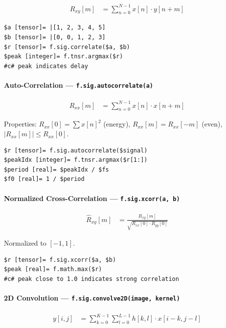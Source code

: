 \begin{align}
R_{xy}[m] &= \sum_{n=0}^{N-1} x[n] \cdot y[n+m] \label{eq:sig-correlate}
\end{align}

\begin{verbatim}
$a [tensor]= |[1, 2, 3, 4, 5]
$b [tensor]= |[0, 0, 1, 2, 3]
$r [tensor]= f.sig.correlate($a, $b)
$peak [integer]= f.tnsr.argmax($r)
#c# peak indicates delay
\end{verbatim}

\paragraph{Auto-Correlation --- \texttt{f.sig.autocorrelate(a)}}

\begin{align}
R_{xx}[m] &= \sum_{n=0}^{N-1} x[n] \cdot x[n+m] \label{eq:sig-autocorr}
\end{align}

Properties: $R_{xx}[0] = \sum x[n]^2$ (energy), $R_{xx}[m] = R_{xx}[-m]$ (even), $|R_{xx}[m]| \leq R_{xx}[0]$.

\begin{verbatim}
$r [tensor]= f.sig.autocorrelate($signal)
$peakIdx [integer]= f.tnsr.argmax($r[1:])
$period [real]= $peakIdx / $fs
$f0 [real]= 1 / $period
\end{verbatim}

\paragraph{Normalized Cross-Correlation --- \texttt{f.sig.xcorr(a, b)}}

\begin{align}
\hat{R}_{xy}[m] &= \frac{R_{xy}[m]}{\sqrt{R_{xx}[0] \cdot R_{yy}[0]}} \label{eq:sig-xcorr}
\end{align}

Normalized to $[-1, 1]$.

\begin{verbatim}
$r [tensor]= f.sig.xcorr($a, $b)
$peak [real]= f.math.max($r)
#c# peak close to 1.0 indicates strong correlation
\end{verbatim}

\paragraph{2D Convolution --- \texttt{f.sig.convolve2D(image, kernel)}}

\begin{align}
y[i,j] &= \sum_{k=0}^{K-1} \sum_{l=0}^{L-1} h[k,l] \cdot x[i-k, j-l] \label{eq:sig-conv2d}
\end{align}

